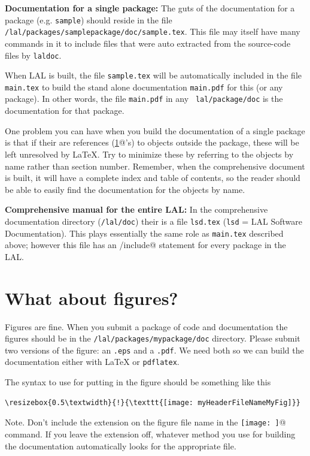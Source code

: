 \documentclass[oneside]{book}
\begin{document}
{\bf Documentation for a single package:} 
The guts of the documentation for a package (e.g. {\tt sample}) should reside in the
file {\tt /lal/packages/samplepackage/doc/sample.tex}.  
This file may
itself have many \verb@@ commands in it to include files that
were auto extracted from the source-code files by {\tt laldoc}.

When LAL is built, the file  {\tt sample.tex}  will be
automatically included in the file {\tt main.tex} to build the
stand alone documentation  {\tt main.pdf} for this (or any
package). In other words, the file  {\tt main.pdf} in any {\tt
lal/package/doc} is the documentation for that package.

One problem you can have when you build the documentation of a single
package is that if their are references (\verb@\ref{}@'s)  to objects
outside the package, these will be left unresolved by {\LaTeX}.  Try to
minimize these by referring to the objects by name rather than section
number.  Remember, when the comprehensive document is built, it will
have a complete index and table of contents, so the reader should be
able to easily find the documentation for the objects by name.

{\bf Comprehensive manual for the entire LAL:} In the comprehensive
documentation directory ({\tt /lal/doc}) their is a file {\tt lsd.tex}
({\tt lsd} = LAL Software Documentation). This plays essentially the
same role as {\tt main.tex} described above; however this file has an
\verb@/include{}@ statement for every package in the LAL.

\section{What about figures?}

Figures are fine. When you submit a package of code and documentation
the figures should be in the {\tt /lal/packages/mypackage/doc} directory.
Please submit two versions of the figure: an {\tt .eps} and a {\tt .pdf}.
We need both so we can build the documentation either with 
{\LaTeX} or {\tt pdflatex}.

The syntax to use for putting in the figure should be something like this
\begin{verbatim}
\resizebox{0.5\textwidth}{!}{\texttt{[image: myHeaderFileNameMyFig]}}
\end{verbatim}
Note. Don't include the extension on the figure file name in
the \verb@\texttt{[image: ]}@ command. If you leave the extension off, 
whatever method you use for building the documentation automatically
looks for the appropriate file.
\end{document}
